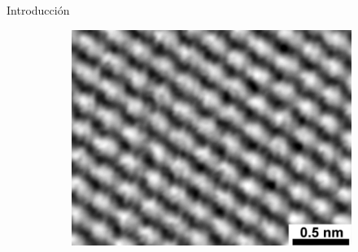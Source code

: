\documentclass[aspectratio=169]{beamer}
\begin{document}
\begin{frame}{Introducción}
\begin{figure}
\begin{subfigure}[b]{0.15\textwidth}
				\caption{}
				\label{fig:graphite_image}
			\end{subfigure}
			\begin{subfigure}[b]{0.15\textwidth}
				\caption{}
				\label{fig:graphene_struct}
			\end{subfigure}
			\begin{subfigure}[b]{0.15\textwidth}
				\includegraphics[width=\textwidth]{graphene_image.jpg}
				\caption{}
				\label{fig:graphene_image}
			\end{subfigure}

\end{figure}
\end{frame}
\end{document}

